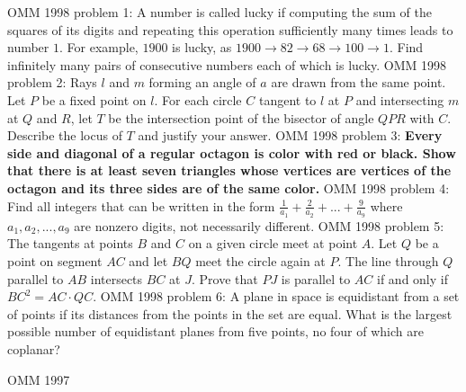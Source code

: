 OMM 1998 problem 1:  A number is called lucky if computing the sum of the squares of its digits and repeating this operation sufficiently many times leads to number $1$. For example, $1900$ is lucky, as $1900 \to 82 \to 68 \to 100 \to 1$. Find infinitely many pairs of consecutive numbers each of which is lucky. 
OMM 1998 problem 2:  Rays $l$ and $m$ forming an angle of $a$ are drawn from the same point. Let $P$ be a fixed point on $l$. For each circle $C$ tangent to $l$ at $P$ and intersecting $m$ at $Q$ and $R$, let $T$ be the intersection point of the bisector of angle $QPR$ with $C$. Describe the locus of $T$ and justify your answer. 
OMM 1998 problem 3:  \textbf{Every side and diagonal of a regular octagon is color with red or black. Show that there is at least seven triangles whose vertices are vertices of the octagon and its three sides are of the same color.} 
OMM 1998 problem 4:  Find all integers that can be written in the form $\frac{1}{a_1}+\frac{2}{a_2}+...+\frac{9}{a_9}$ where $a_1,a_2, ...,a_9$ are nonzero digits, not necessarily different. 
OMM 1998 problem 5:  The tangents at points $B$ and $C$ on a given circle meet at point $A$. Let $Q$ be a point on segment $AC$ and let $BQ$ meet the circle again at $P$. The line through $Q $ parallel to $AB$ intersects $BC$ at $J$. Prove that $PJ$ is parallel to $AC$ if and only if $BC^2 = AC\cdot QC$. 
OMM 1998 problem 6:  A plane in space is equidistant from a set of points if its distances from the points in the set are equal. What is the largest possible number of equidistant planes from five points, no four of which are coplanar? 

OMM 1997 

